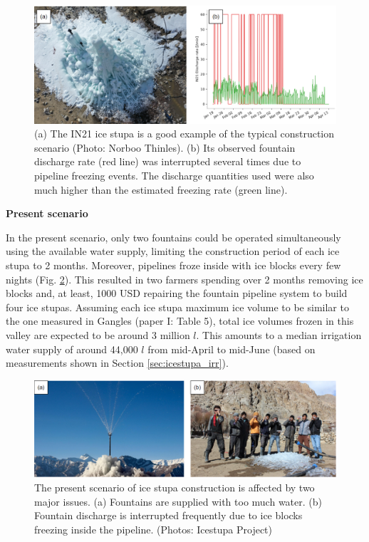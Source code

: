 \begin{figure}[htb]
	\includegraphics[width=\textwidth]{figs/gangles_data}

  \caption{(a) The IN21 ice stupa is a good example of the typical construction scenario (Photo: Norboo
  Thinles). (b) Its observed fountain discharge rate (red line) was interrupted several times due to pipeline
freezing events. The discharge quantities used were also much higher than the estimated freezing rate (green
line). }

	\label{fig:gangles_data}
\end{figure}

\textbf{Present scenario}

In the present scenario, only two fountains could be operated simultaneously using the available water
supply, limiting the construction period of each ice stupa to 2 months. Moreover, pipelines froze
inside with ice blocks every few nights (Fig. \ref{fig:issues}). This resulted in two farmers spending over 2 months removing ice blocks and, at least, 1000 USD repairing the fountain pipeline system to build
four ice stupas. Assuming each ice stupa maximum ice volume to be similar to the one measured in Gangles (paper I:
Table 5), total ice volumes frozen in this valley are expected to be around 3 million $l$. This amounts to
a median irrigation water supply of around 44,000 $l$ from mid-April to mid-June (based on measurements
shown in Section \ref{sec:icestupa_irr}).

\begin{figure}[htb]
	\includegraphics[width=\textwidth]{figs/construction_issues}

  \caption{The present scenario of ice stupa construction is affected by two major issues. (a) Fountains are
  supplied with too much water. (b) Fountain discharge is interrupted frequently due to ice blocks freezing
  inside the pipeline. (Photos: Icestupa Project)}

	\label{fig:issues}
\end{figure}

